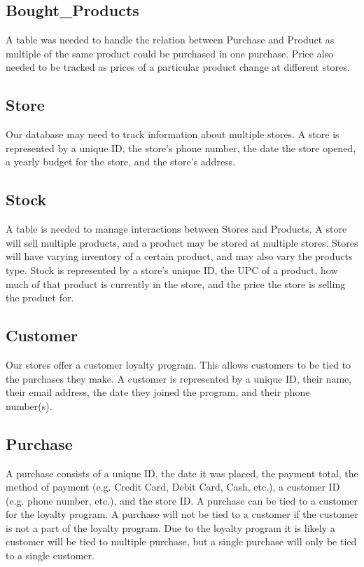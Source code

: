\documentclass{article}
\begin{document}
		\subsection{Bought\_Products}
			A table was needed to handle the relation between Purchase and Product
			as multiple of the same product could be purchased in one purchase.
			Price also needed to be tracked as prices of a particular product change
			at different stores.

		\subsection{Store}
			Our database may need to track information about multiple stores. A store
			is represented by a unique ID, the store's phone number, the date the
			store opened, a yearly budget for the store, and the store's address.

		\subsection{Stock}
			A table is needed to manage interactions between Stores and Products.
			A store will sell multiple products, and a product may be stored at
			multiple stores. Stores will have varying inventory of a certain product,
			and may also vary the products type. Stock is represented by a store's
			unique ID, the UPC of a product, how much of that product is currently in
			the store, and the price the store is selling the product for.

		\subsection{Customer}
			Our stores offer a customer loyalty program. This allows customers to be
			tied to the purchases they make. A customer is represented by a unique ID,
			their name, their email address, the date they joined the program, and
			their phone number(s).

		\subsection{Purchase}
			A purchase consists of a unique ID, the date it was placed, the payment
			total, the method of payment (e.g. Credit Card, Debit Card, Cash, etc.), a
			customer ID (e.g. phone number, etc.), and the store ID. A purchase can
			be tied to a customer for the loyalty program. A purchase will not be
			tied to a customer if the customer is not a part of the loyalty program.
			Due to the loyalty program it is likely a customer will be tied to
			multiple purchase, but a single purchase will only be tied to a
			single customer.
			
\end{document}
